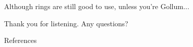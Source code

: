 \documentclass{beamer}            %
\begin{document}
\begin{frame}

\begin{center}
Although rings are still good to use, unless you're Gollum...\vspace{0.5cm}


\vspace{0.5cm}

Thank you for listening. Any questions?

\end{center}

\end{frame}


\begin{frame}[allowframebreaks]{References}\scriptsize


\end{frame}

\end{document}
